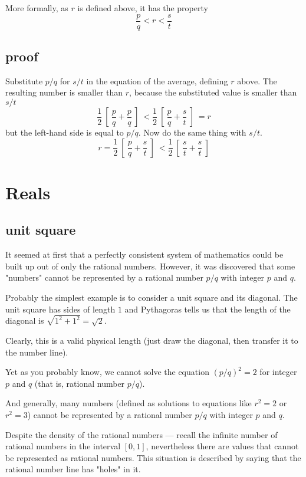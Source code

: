\documentclass[11pt, oneside]{article}
\begin{document}
More formally, as $r$ is defined above, it has the property
\[ \frac{p}{q} < r < \frac{s}{t} \]

\subsection*{proof}

Substitute $p/q$ for $s/t$ in the equation of the average, defining $r$ above.  The resulting number is smaller than $r$, because the substituted value is smaller than $s/t$
\[ \frac{1}{2} \ [ \  \frac{p}{q} + \frac{p}{q} \ ] \ < \frac{1}{2} \ [ \  \frac{p}{q} + \frac{s}{t} \ ] \  = r \]
but the left-hand side is equal to $p/q$.  Now do the same thing with $s/t$.
\[ r = \frac{1}{2} \ [ \  \frac{p}{q} + \frac{s}{t} \ ] \ < \frac{1}{2} \ [ \  \frac{s}{t} + \frac{s}{t} \ ]  \]

\section{Reals}

\subsection*{unit square}

It seemed at first that a perfectly consistent system of mathematics could be built up out of only the rational numbers.  However, it was discovered that some "numbers" cannot be represented by a rational number $p/q$ with integer $p$ and $q$.

Probably the simplest example is to consider a unit square and its diagonal.  The unit square has sides of length $1$ and Pythagoras tells us that the length of the diagonal is $\sqrt{1^2 + 1^2} = \sqrt{2}$.

Clearly, this is a valid physical length (just draw the diagonal, then transfer it to the number line).

Yet as you probably know, we cannot solve the equation $(p/q)^2 = 2$ for integer $p$ and $q$ (that is, rational number $p/q$).

And generally, many numbers (defined as solutions to equations like $r^2 = 2$ or $r^2 = 3$) cannot be represented by a rational number $p/q$ with integer $p$ and $q$.  

Despite the density of the rational numbers --- recall the infinite number of rational numbers in the interval $[0,1]$, nevertheless there are values that cannot be represented as rational numbers.  This situation is described by saying that the rational number line has "holes" in it.
\end{document}
